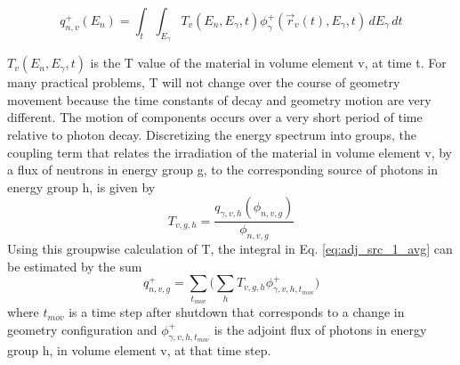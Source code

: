  \begin{equation}\label{eq:adj_src_1_avg}
	 q_{n,v}^{+}(E_{n}) =
	 \int_{t}  \int_{E_{\gamma}}
	 T_{v}(E_n, E_{\gamma}, t) 
	 \phi_{\gamma}^{+}(\overrightarrow{r}_{v}(t), E_{\gamma},t)
	 \, dE_{\gamma} \, dt
 \end{equation}

$T_{v}(E_n, E_{\gamma}, t) $ is the T value of the material in volume
element v, at time t.
For many practical problems, T will not change over the course of
geometry movement  because the time constants of decay and geometry
motion are very different.  The motion of components occurs over a very short
period of time relative to photon decay.  
Discretizing the energy spectrum into groups, the coupling term that relates 
the irradiation of the material in volume
element v, by a flux of neutrons in energy group g, to the corresponding source of
photons in energy group h, 
is given by
\begin{equation}\label{eq:T}
	T_{v,g,h} = \dfrac{q_{\gamma,v,h}(\phi_{n,v,g})}{\phi_{n,v,g}}
\end{equation}
Using this groupwise calculation of T, the integral in Eq. \ref{eq:adj_src_1_avg} can be estimated by the sum
\begin{equation}\label{eq:tgt_n_src}
	q_{n,v,g}^{+} =
	\sum_{t_{mov}}\Bigg(\sum_{h} T_{v,g,h} \phi_{\gamma,v,h,t_{mov}}^{+}\Bigg)
\end{equation}
where $t_{mov}$ is a time step after shutdown that corresponds to a change in
geometry configuration and $\phi_{\gamma,v,h,t_{mov}}^{+}$ is the adjoint flux
of photons in energy group h, in volume element v, at that time step.
